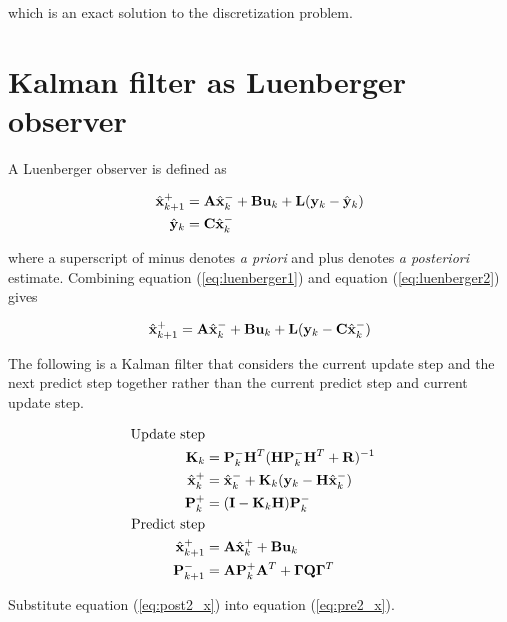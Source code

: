 which is an exact solution to the \gls{discretization} problem.

\section{Kalman filter as Luenberger observer}
\label{sec:deriv_kalman_luenberger}

A Luenberger \gls{observer} is defined as

\begin{align}
  \hat{\mathbf{x}}_{k+1}^+ &= \mathbf{A}\hat{\mathbf{x}}_k^- + \mathbf{B}\mathbf{u}_k + \mathbf{L}
    (\mathbf{y}_k - \hat{\mathbf{y}}_k) \label{eq:luenberger1} \\
  \hat{\mathbf{y}}_k &= \mathbf{C} \hat{\mathbf{x}}_k^- \label{eq:luenberger2}
\end{align}

where a superscript of minus denotes \textit{a priori} and plus denotes
\textit{a posteriori} estimate. Combining equation (\ref{eq:luenberger1}) and
equation (\ref{eq:luenberger2}) gives

\begin{equation} \label{eq:luenberger}
  \hat{\mathbf{x}}_{k+1}^+ = \mathbf{A}\hat{\mathbf{x}}_k^- + \mathbf{B}\mathbf{u}_k + \mathbf{L}
    (\mathbf{y}_k - \mathbf{C}\hat{\mathbf{x}}_k^-)
\end{equation}

The following is a Kalman filter that considers the current update step and the
next predict step together rather than the current predict step and current
update step.

\begin{align}
  \text{Update step} \nonumber \\
  \mathbf{K}_k &= \mathbf{P}_k^- \mathbf{H}^T (\mathbf{H}\mathbf{P}_k^- \mathbf{H}^T +
    \mathbf{R})^{-1} \\
  \hat{\mathbf{x}}_k^+ &= \hat{\mathbf{x}}_k^- + \mathbf{K}_k(\mathbf{y}_k -
    \mathbf{H}\hat{\mathbf{x}}_k^-) \label{eq:post2_x} \\
  \mathbf{P}_k^+ &= (\mathbf{I} - \mathbf{K}_k\mathbf{H})\mathbf{P}_k^- \\
  \text{Predict step} \nonumber \\
  \hat{\mathbf{x}}_{k+1}^+ &= \mathbf{A}\hat{\mathbf{x}}_k^+ + \mathbf{B}\mathbf{u}_k
    \label{eq:pre2_x} \\
  \mathbf{P}_{k+1}^- &= \mathbf{A} \mathbf{P}_k^+ \mathbf{A}^T +
    \mathbf{\Gamma}\mathbf{Q}\mathbf{\Gamma}^T
\end{align}

Substitute equation (\ref{eq:post2_x}) into equation (\ref{eq:pre2_x}).


